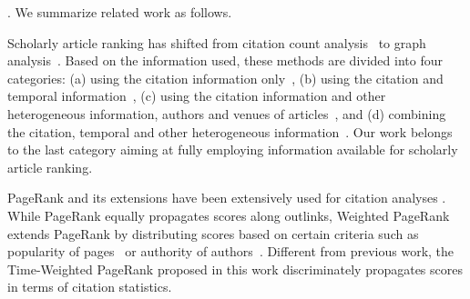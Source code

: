 . We summarize related work as follows.
%

Scholarly article ranking has shifted from citation count analysis~\cite{Garfield471,Hirsch15112005} to graph analysis~\cite{ChenXMR07,Zhou07-CoRank,Jiang12-MRank,Liang16AAAI,Li08TSRanking,Wang13AAAI,WalkerXKM07,sayyadi09,
Wang16TIST,Ng11KDD}.
Based on the information used, these methods are divided into four categories: (a) using the citation information only~\cite{Garfield471,Hirsch15112005,ChenXMR07,Ng11KDD}, (b) using the citation and temporal information~\cite{Li08TSRanking,WalkerXKM07}, (c) using the citation information and other heterogeneous information, \eg authors and venues of articles~\cite{Zhou07-CoRank,Jiang12-MRank,Liang16AAAI}, and (d) combining the citation, temporal and other heterogeneous information~\cite{sayyadi09,Wang16TIST,Wang13AAAI}.
Our work belongs to the last category aiming at fully employing information available for scholarly article ranking.




PageRank \cite{Brin98:PageRank} and its extensions have been extensively used for citation analyses \cite{Waltman2014}. While PageRank equally propagates scores along outlinks, Weighted PageRank extends PageRank by distributing scores based on certain criteria such as popularity of pages~\cite{Xing04:WPR} or authority of authors~\cite{Ding11}.  Different from previous work, the Time-Weighted PageRank proposed in this work discriminately propagates scores in terms of citation statistics.








